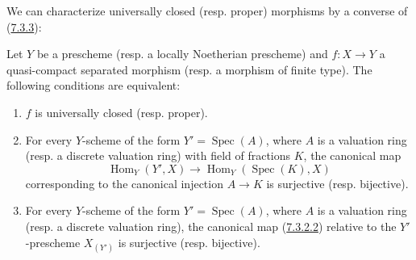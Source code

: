 We can characterize universally closed (resp. proper) morphisms
by a converse of (\hyperref[II.7.3.3]{7.3.3}):

\begin{theorem}[7.3.8]
\label{II.7.3.8}
Let $Y$ be a prescheme \textup{(resp.} a locally Noetherian prescheme\textup{)} and $f:X\to Y$
a quasi-compact separated morphism \textup{(resp.} a morphism of finite type\textup{)}. The
following conditions are equivalent:
\begin{enumerate}
\item[\rm a)] $f$ is universally closed \textup{(resp.} proper\textup{)}.
\item[\rm b)] For every $Y$-scheme of the form
$Y'=\operatorname{Spec}(A)$, where $A$ is a valuation ring \textup{(resp.} a discrete
valuation ring) with field of fractions $K$, the canonical map
\[
\operatorname{Hom}_Y(Y',X)\longrightarrow
\operatorname{Hom}_Y(\operatorname{Spec}(K),X)
\]
corresponding to the canonical injection $A\to K$ is surjective \textup{(resp.}
bijective\textup{)}.
\item[\rm c)] For every $Y$-scheme of the form $Y'=\operatorname{Spec}(A)$,
where $A$ is a valuation ring \textup{(resp.} a discrete valuation ring),
the canonical map \textup{(\hyperref[II.7.3.2.2]{7.3.2.2})} relative to the
$Y'$-prescheme $X_{(Y')}$ is surjective \textup{(resp.} bijective).
\end{enumerate}
\end{theorem}

